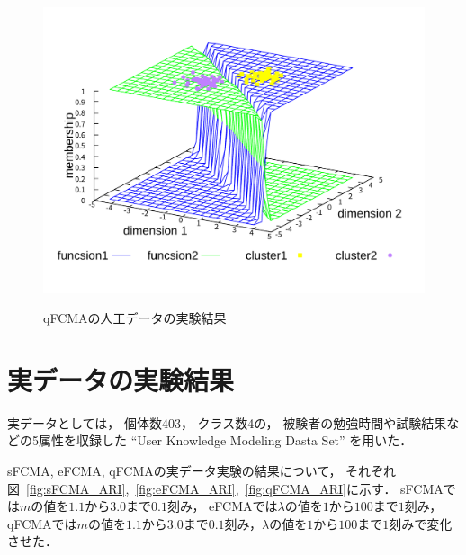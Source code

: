 \documentclass[twocolumn, a4paper]{icethesisabst}
\begin{document}
\begin{figure}[htbp]
\begin{minipage}{0.43\hsize}
  \includegraphics[width=\linewidth]{qFCMA-Em11-Lambda10.pdf}
  \label{fig:qFCMA-Em11-Lambda10}
 \end{minipage}
 \vspace*{0.5cm}
 \caption{qFCMAの人工データの実験結果}
\end{figure}


\section{実データの実験結果}
実データとしては，
個体数403，
クラス数4の，
被験者の勉強時間や試験結果などの5属性を収録した
``User Knowledge Modeling Dasta Set''
を用いた．

sFCMA, eFCMA, qFCMAの実データ実験の結果について，
それぞれ図~\ref{fig:sFCMA_ARI},~\ref{fig:eFCMA_ARI},~\ref{fig:qFCMA_ARI}に示す．
sFCMAでは$m$の値を$1.1$から$3.0$まで$0.1$刻み，
eFCMAでは$\lambda$の値を$1$から$100$まで$1$刻み，
qFCMAでは$m$の値を$1.1$から$3.0$まで$0.1$刻み，$\lambda$の値を$1$から$100$まで$1$刻みで変化させた．
\end{document}
